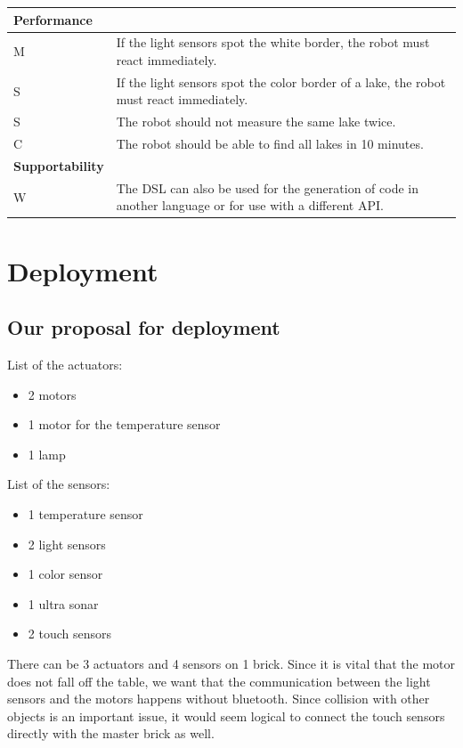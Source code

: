 \documentclass[11pt,a4paper]{article}
\begin{document}
\begin{tabular}{|p{5cm}|p{10cm}|}
  \textbf{Performance}&\\
\hline
M & If the light sensors spot the white border, the robot must react immediately.\\
S & If the light sensors spot the color border of a lake, the robot must react immediately.\\
S & The robot should not measure the same lake twice.\\
C & The robot should be able to find all lakes in 10 minutes. \\

\hline
   \textbf{Supportability}&\\
\hline
W & The DSL can also be used for the generation of code in another language or for use with a different API.\\
\hline
\end{tabular}

\pagebreak 
\section{Deployment}
\subsection{Our proposal for deployment}
List of the actuators:
\begin{itemize}
\item 2 motors
\item 1 motor for  the temperature sensor
\item 1 lamp
\end{itemize}

\noindent List of the sensors:
\begin{itemize}
\item 1 temperature sensor
\item 2 light sensors
\item 1 color sensor
\item 1 ultra sonar
\item 2 touch sensors
\end{itemize}

There can be 3 actuators and 4 sensors on 1 brick.
Since it is vital that the motor does not fall off the table, we want that the communication between the light sensors and the motors happens without bluetooth. Since collision with other objects is an important issue, it would seem logical to connect the touch sensors directly with the master brick as well.\\ 
\end{document}
